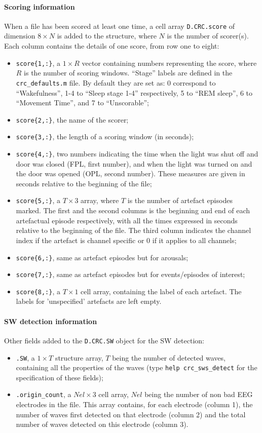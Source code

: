 \documentclass[a4paper,titlepage]{article}
\newcommand{\bi}{\begin{itemize}}
\newcommand{\ei}{\end{itemize}}
\begin{document}
\paragraph{Scoring information}
When a file has been scored at least one time, a cell array {\tt D.CRC.score} of dimension $8\times N$ is added to the structure, where $N$ is the number of scorer(s). Each column contains the details of one score, from row one to eight:
\bi
\item{{\tt score\{1,:\}},} a $1\times R$ vector containing numbers representing the score, where $R$ is the number of scoring windows. ``Stage'' labels  are defined in the {\tt crc\_defaults.m} file. By default they are set as: 0 correspond to ``Wakefulness'', 1-4 to ``Sleep stage 1-4'' respectively, 5 to ``REM sleep'', 6 to ``Movement Time'', and 7 to ``Unscorable'';
\item{{\tt score\{2,:\}},} the name of the scorer;
\item{{\tt score\{3,:\}},} the length of a scoring window (in seconds);
\item{{\tt score\{4,:\}},} two numbers indicating the time when the light was shut off and door was closed (FPL, first number), and when the light was turned on and the door was opened (OPL, second number). These measures are given in seconds relative to the beginning of the file;
\item{{\tt score\{5,:\}},} a $T\times 3$ array, where $T$ is the number of artefact episodes marked. The first and the second columns is the beginning and end of each artefactual episode respectively, with all the times expressed in seconds relative to the beginning of the file. The third column indicates the channel index if the artefact is channel specific or 0 if it applies to all channels;
\item{{\tt score\{6,:\}},} same as artefact episodes but for arousals;
\item{{\tt score\{7,:\}},} same as artefact episodes but for events/episodes of interest;
\item{{\tt score\{8,:\}},} a $T\times 1$ cell array, containing the label of each artefact. The labels for 'unspecified' artefacts are left empty.
\ei

\paragraph{SW detection information}
Other fields added to the {\tt D.CRC.SW} object for the SW detection:
\bi
\item {\tt .SW}, a $1\times T$ structure array, $T$ being the number of detected waves, containing all the properties of the waves (type {\tt help crc\_sws\_detect} for the specification of these fields);
\item {\tt .origin\_count}, a $N\!el\times 3$ cell array, $N\!el$ being the number of non bad EEG electrodes in the file. This array contains, for each electrode (column 1), the number of waves first detected on that electrode (column 2) and the total number of waves detected on this electrode (column 3).
\ei
\end{document}
